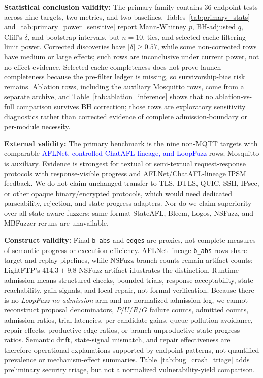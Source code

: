\documentclass[final,5p,times,number]{elsarticle}
\begin{document}
\textbf{Statistical conclusion validity:} The primary family contains 36 endpoint tests across nine targets, two metrics, and two baselines. Tables~\ref{tab:primary_stats} and~\ref{tab:primary_power_sensitive} report Mann-Whitney $p$, BH-adjusted $q$, Cliff's $\delta$, and bootstrap intervals, but $n=10$, ties, and selected-cache filtering limit power. Corrected discoveries have $|\delta|\ge0.57$, while some non-corrected rows have medium or large effects; such rows are inconclusive under current power, not no-effect evidence. Selected-cache completeness does not prove launch completeness because the pre-filter ledger is missing, so survivorship-bias risk remains. Ablation rows, including the auxiliary Mosquitto rows, come from a separate archive, and Table~\ref{tab:ablation_inference} shows that no ablation-vs-full comparison survives BH correction; those rows are exploratory sensitivity diagnostics rather than corrected evidence of complete admission-boundary or per-module necessity.

\textbf{External validity:} The primary benchmark is the nine non-MQTT targets with comparable \textcolor{blue}{AFLNet, controlled ChatAFL-lineage, and LoopFuzz} rows; Mosquitto is auxiliary. Evidence is strongest for textual or semi-textual request-response protocols with response-visible progress and AFLNet/ChatAFL-lineage IPSM feedback. We do not claim unchanged transfer to TLS, DTLS, QUIC, SSH, IPsec, or other opaque binary/encrypted protocols, which would need dedicated parseability, rejection, and state-progress adapters. Nor do we claim superiority over all state-aware fuzzers: same-format StateAFL, Bleem, Logos, NSFuzz, and MBFuzzer reruns are unavailable.

\textbf{Construct validity:} Final \texttt{b\_abs} and \texttt{edges} are proxies, not complete measures of semantic progress or execution efficiency. AFLNet-lineage \texttt{b\_abs} rows share target and replay pipelines, while NSFuzz branch counts remain artifact counts; LightFTP's $414.3{\pm}9.8$ NSFuzz artifact illustrates the distinction. Runtime admission means structured checks, bounded trials, response acceptability, state reachability, gain signals, and local repair, not formal verification. Because there is no \emph{LoopFuzz-no-admission} arm and no normalized admission log, we cannot reconstruct proposal denominators, $P/U/R/G$ failure counts, admitted counts, admission ratios, trial latencies, per-candidate gains, queue-pollution avoidance, repair effects, productive-edge ratios, or branch-unproductive state-progress ratios. Semantic drift, state-signal mismatch, and repair effectiveness are therefore operational explanations supported by endpoint patterns, not quantified prevalence or mechanism-effect summaries. Table~\ref{tab:bug_crash_triage} adds preliminary security triage, but not a normalized vulnerability-yield comparison.
\end{document}
